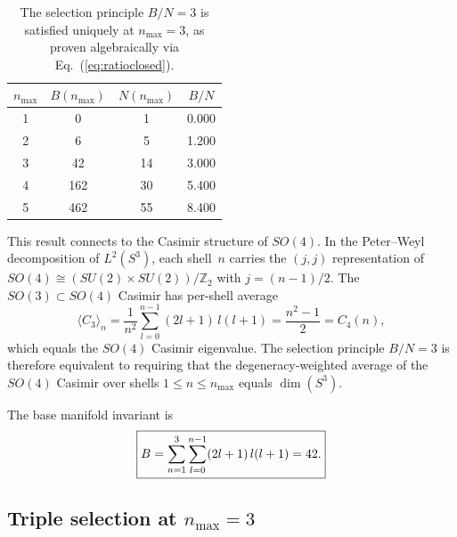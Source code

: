 \documentclass[aps,prl,twocolumn,superscriptaddress]{revtex4-2}
\begin{document}
\begin{table}[h]
\centering
\begin{tabular}{cccc}
\hline\hline
$n_{\max}$ & $B(n_{\max})$ & $N(n_{\max})$ & $B/N$ \\
\hline
1 & 0   & 1  & 0.000 \\
2 & 6   & 5  & 1.200 \\
3 & 42  & 14 & 3.000 \\
4 & 162 & 30 & 5.400 \\
5 & 462 & 55 & 8.400 \\
\hline\hline
\end{tabular}
\caption{The selection principle $B/N = 3$ is satisfied uniquely at
$n_{\max} = 3$, as proven algebraically via
Eq.~(\ref{eq:ratioclosed}).}
\label{tab:selection}
\end{table}

This result connects to the Casimir structure of $SO(4)$. In the
Peter--Weyl decomposition of $L^2(S^3)$, each shell~$n$ carries the
$(j,j)$ representation of $SO(4) \cong (SU(2) \times SU(2))/\mathbb{Z}_2$
with $j = (n-1)/2$. The $SO(3) \subset SO(4)$ Casimir has per-shell
average
\begin{equation}\label{eq:casimir_identity}
  \langle C_3 \rangle_n
  = \frac{1}{n^2}\sum_{l=0}^{n-1}(2l+1)\,l(l+1)
  = \frac{n^2-1}{2} = C_4(n),
\end{equation}
which equals the $SO(4)$ Casimir eigenvalue. The selection principle
$B/N = 3$ is therefore equivalent to requiring that the
degeneracy-weighted average of the $SO(4)$ Casimir over shells
$1 \leq n \leq n_{\max}$ equals $\dim(S^3)$.

The base manifold invariant is
\begin{equation}\label{eq:base}
  \boxed{B = \sum_{n=1}^{3}\sum_{l=0}^{n-1}(2l+1)\,l(l+1) = 42.}
  \vphantom{\Bigg|}
\end{equation}


\subsection{Triple selection at $n_{\max}=3$}\label{sec:triple_selection}
\end{document}
